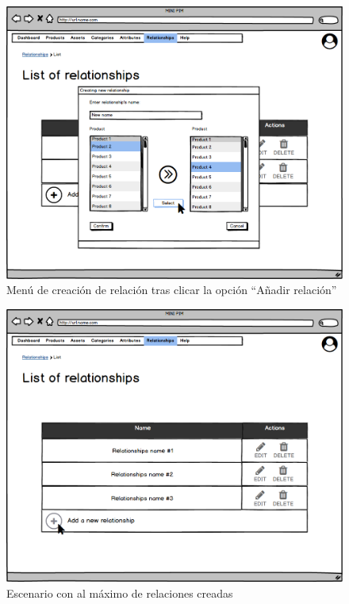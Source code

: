 \begin{figure}[H]
    \includegraphics[width=1\linewidth]{assets/mockups/RF5.1_2.png}
    \caption{Menú de creación de relación tras clicar la opción \enquote{Añadir relación}}
   \end{figure}
\vspace{1.0cm}

\begin{figure}[H]
    \includegraphics[width=1\linewidth]{assets/mockups/RF5.1_3.png}
    \caption{Escenario con al máximo de relaciones creadas}
   \end{figure}
\vspace{1.0cm}

